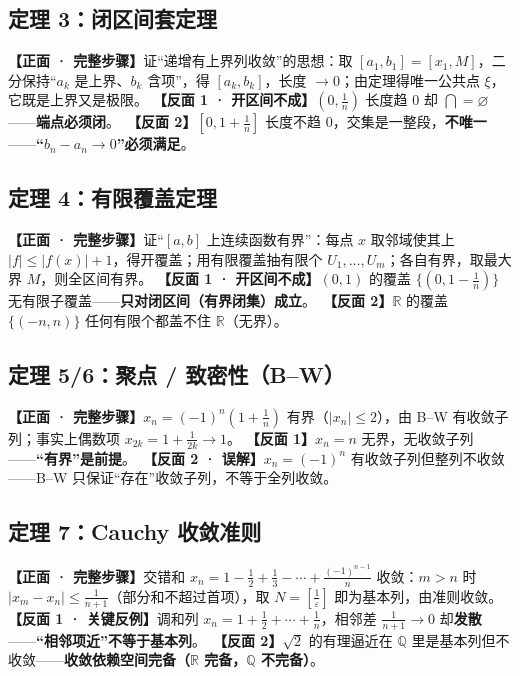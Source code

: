 \documentclass[11pt,a4paper,UTF8]{ctexart}
\newcommand{\R}{\mathbb R}
\newcommand{\eps}{\varepsilon}
\newcommand{\Q}{\mathbb Q}
\begin{document}
\subsection{定理 3：闭区间套定理}

\noindent\textbf{【正面 · 完整步骤】}证“递增有上界列收敛”的思想：取 $[a_1,b_1]=[x_1,M]$，二分保持“$a_k$ 是上界、$b_k$ 含项”，得 $[a_k,b_k]$，长度 $\to0$；由定理得唯一公共点 $\xi$，它既是上界又是极限。
\textbf{【反面 1 · 开区间不成】}$(0,\tfrac1n)$ 长度趋 0 却 $\bigcap=\varnothing$——\textbf{端点必须闭}。\ \textbf{【反面 2】}$[0,1+\tfrac1n]$ 长度不趋 0，交集是一整段，\textbf{不唯一}——\textbf{“$b_n-a_n\to0$”必须满足}。

\subsection{定理 4：有限覆盖定理}

\noindent\textbf{【正面 · 完整步骤】}证“$[a,b]$ 上连续函数有界”：每点 $x$ 取邻域使其上 $|f|\le|f(x)|+1$，得开覆盖；用有限覆盖抽有限个 $U_1,\dots,U_m$；各自有界，取最大界 $M$，则全区间有界。
\textbf{【反面 1 · 开区间不成】}$(0,1)$ 的覆盖 $\{(0,1-\tfrac1n)\}$ 无有限子覆盖——\textbf{只对闭区间（有界闭集）成立}。\ \textbf{【反面 2】}$\R$ 的覆盖 $\{(-n,n)\}$ 任何有限个都盖不住 $\R$（无界）。

\subsection{定理 5/6：聚点 / 致密性（B–W）}

\noindent\textbf{【正面 · 完整步骤】}$x_n=(-1)^n(1+\tfrac1n)$ 有界（$|x_n|\le2$），由 B–W 有收敛子列；事实上偶数项 $x_{2k}=1+\tfrac1{2k}\to1$。
\textbf{【反面 1】}$x_n=n$ 无界，无收敛子列——\textbf{“有界”是前提}。\ \textbf{【反面 2 · 误解】}$x_n=(-1)^n$ 有收敛子列但整列不收敛——B–W 只保证“存在”收敛子列，不等于全列收敛。

\subsection{定理 7：Cauchy 收敛准则}

\noindent\textbf{【正面 · 完整步骤】}交错和 $x_n=1-\tfrac12+\tfrac13-\cdots+\tfrac{(-1)^{n-1}}n$ 收敛：$m>n$ 时 $|x_m-x_n|\le\frac1{n+1}$（部分和不超过首项），取 $N=[\tfrac1\eps]$ 即为基本列，由准则收敛。
\textbf{【反面 1 · 关键反例】}调和列 $x_n=1+\tfrac12+\cdots+\tfrac1n$，相邻差 $\tfrac1{n+1}\to0$ 却\textbf{发散}——\textbf{“相邻项近”不等于基本列}。\ \textbf{【反面 2】}$\sqrt2$ 的有理逼近在 $\Q$ 里是基本列但不收敛——\textbf{收敛依赖空间完备（$\R$ 完备，$\Q$ 不完备）}。
\end{document}
